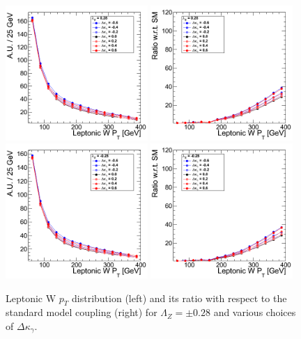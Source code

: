 \begin{figure}[h!t]
  {\centering
    \includegraphics[width=0.48\textwidth]{figs/LeptonicWpT_028.png}
    \includegraphics[width=0.48\textwidth]{figs/LeptonicWpT_028_ratio.png}
    \includegraphics[width=0.48\textwidth]{figs/LeptonicWpT_m028.png}
    \includegraphics[width=0.48\textwidth]{figs/LeptonicWpT_m028_ratio.png}
    \caption{Leptonic W $p_T$ distribution (left) and its ratio with respect to 
    the standard model coupling (right) for $\Lambda_Z = \pm 0.28$ and various choices of $\Delta{\kappa_\gamma}$.}
    \label{fig:ww_LeptonicWpT_atgcRatio028}}
\end{figure}
